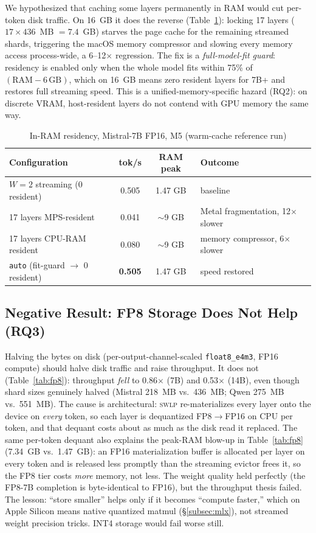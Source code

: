 \documentclass[10pt,a4paper]{article}
\newcommand{\swlp}{\textsc{swlp}}
\begin{document}
We hypothesized that caching some layers permanently in RAM would cut per-token
disk traffic. On 16~GB it does the reverse (Table~\ref{tab:residency}): locking 17
layers ($17 \times 436$~MB $= 7.4$~GB) starves the page cache for the remaining
streamed shards, triggering the macOS memory compressor and slowing every memory
access process-wide, a 6--12$\times$ regression. The fix is a
\emph{full-model-fit guard}: residency is enabled only when the whole model fits
within 75\% of $(\text{RAM} - 6\,\text{GB})$, which on 16~GB means zero resident
layers for 7B+ and restores full streaming speed. This is a unified-memory-specific
hazard (RQ2): on discrete VRAM, host-resident layers do not contend with GPU
memory the same way.

\begin{table}[htbp]
\centering
\caption{In-RAM residency, Mistral-7B FP16, M5 (warm-cache reference run)}
\label{tab:residency}
\begin{tabular}{@{}lccl@{}}
\toprule
\textbf{Configuration} & \textbf{tok/s} & \textbf{RAM peak} & \textbf{Outcome} \\
\midrule
$W=2$ streaming (0 resident) & 0.505 & 1.47 GB & baseline \\
17 layers MPS-resident & 0.041 & $\sim$9 GB & Metal fragmentation, 12$\times$ slower \\
17 layers CPU-RAM resident & 0.080 & $\sim$9 GB & memory compressor, 6$\times$ slower \\
\texttt{auto} (fit-guard $\to$ 0 resident) & \textbf{0.505} & 1.47 GB & speed restored \\
\bottomrule
\end{tabular}
\end{table}

\subsection{Negative Result: FP8 Storage Does Not Help (RQ3)}
\label{subsec:fp8}

Halving the bytes on disk (per-output-channel-scaled \texttt{float8\_e4m3}, FP16
compute) should halve disk traffic and raise throughput. It does not
(Table~\ref{tab:fp8}): throughput \emph{fell} to 0.86$\times$ (7B) and 0.53$\times$
(14B), even though shard sizes genuinely halved (Mistral 218~MB vs.\ 436~MB; Qwen
275~MB vs.\ 551~MB). The cause is architectural: \swlp{} re-materializes every
layer onto the device on \emph{every} token, so each layer is dequantized
FP8$\to$FP16 on CPU per token, and that dequant costs about as much as the disk
read it replaced. The same per-token dequant also explains the peak-RAM blow-up
in Table~\ref{tab:fp8} (7.34~GB vs.\ 1.47~GB): an FP16 materialization buffer is
allocated per layer on every token and is released less promptly than the
streaming evictor frees it, so the FP8 tier costs \emph{more} memory, not less.
The weight quality held perfectly (the FP8-7B completion is
byte-identical to FP16), but the throughput thesis failed. The lesson:
``store smaller'' helps only if it becomes ``compute faster,'' which on Apple
Silicon means native quantized matmul (\S\ref{subsec:mlx}), not streamed weight
precision tricks. INT4 storage would fail worse still.
\end{document}
